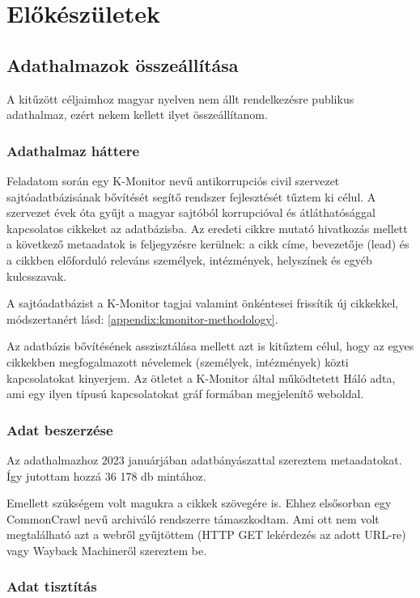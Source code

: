 \chapter{Előkészületek}

\section{Adathalmazok összeállítása}

A kitűzött céljaimhoz magyar nyelven nem állt rendelkezésre publikus adathalmaz, ezért nekem kellett ilyet összeállítanom.

\subsection{Adathalmaz háttere}

Feladatom során egy K-Monitor nevű antikorrupciós civil szervezet sajtóadatbázisának bővítését segítő rendszer fejlesztését tűztem ki célul. A szervezet évek óta gyűjt a magyar sajtóból korrupcióval és átláthatósággal kapcsolatos cikkeket az adatbázisba. Az eredeti cikkre mutató hivatkozás mellett a következő metaadatok is feljegyzésre kerülnek: a cikk címe, bevezetője (lead) és a cikkben előforduló releváns személyek, intézmények, helyszínek és egyéb kulcsszavak.

A sajtóadatbázist a K-Monitor tagjai valamint önkéntesei frissítik új cikkekkel, módszertanért lásd: \ref{appendix:kmonitor-methodology}.

Az adatbázis bővítésének asszisztálása mellett azt is kitűztem célul, hogy az egyes cikkekben megfogalmazott névelemek (személyek, intézmények) közti kapcsolatokat kinyerjem. Az ötletet a K-Monitor által működtetett Háló \cite{ahalo} adta, ami egy ilyen típusú kapcsolatokat gráf formában megjelenítő weboldal.

\subsection{Adat beszerzése}

Az adathalmazhoz 2023 januárjában adatbányászattal szereztem metaadatokat. Így jutottam hozzá 36 178 db mintához.

Emellett szükségem volt magukra a cikkek szövegére is. Ehhez elsősorban egy CommonCrawl nevű archiváló rendszerre támaszkodtam. Ami ott nem volt megtalálható azt a webről gyűjtöttem (HTTP GET lekérdezés az adott URL-re) vagy Wayback Machineről szereztem be.

\subsection{Adat tisztítás}

